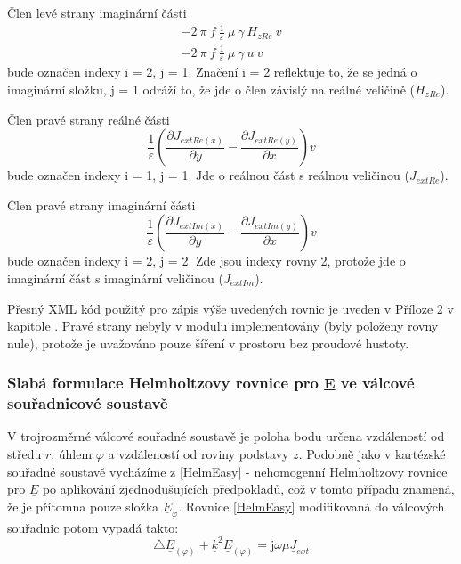 \documentclass[12pt,a4paper,oneside]{article}
\numberwithin{equation}{section} %
\numberwithin{figure}{section} %
\numberwithin{table}{section} %
\newcommand{\mj}{\mathrm{j}} %
\newcommand{\faz}[1]{{\underline{#1}}} %
\begin{document}
Člen levé strany imaginární části
\begin{subequations}
\begin{gather}
- 2 ~ \pi ~ f ~ \frac{1}{\varepsilon} ~ \mu ~ \gamma ~ H _{zRe} ~ v
\\
- 2 ~ \pi ~ f ~ \frac{1}{\varepsilon} ~ \mu ~ \gamma ~ u ~ v
\end{gather}
\end{subequations}
bude označen indexy i = 2, j = 1. Značení i = 2 reflektuje to, že se jedná o imaginární složku, j = 1 odráží to, že jde o člen závislý na reálné veličině ($H _{zRe}$).

Člen pravé strany reálné části
\begin{equation}
\frac{1}{\varepsilon} \left( \frac{\partial J _{extRe(x)}}{\partial y} - \frac{\partial J _{extRe(y)}}{\partial x} \right) v
\end{equation}
bude označen indexy i = 1, j = 1. Jde o reálnou část s reálnou veličinou ($J _{extRe}$). 

Člen pravé strany imaginární části
\begin{equation}
\frac{1}{\varepsilon} \left(\frac{\partial J _{extIm(x)}}{\partial y} - \frac{\partial J _{extIm(y)}}{\partial x} \right)  v
\end{equation}
bude označen indexy i = 2, j = 2. Zde jsou indexy rovny 2, protože jde o imaginární část s imaginární veličinou ($J _{extIm}$).

Přesný XML kód použitý pro zápis výše uvedených rovnic je uveden v Příloze 2 v kapitole . Pravé strany nebyly v modulu implementovány (byly položeny rovny nule), protože je uvažováno pouze šíření v prostoru bez proudové hustoty.


\subsubsection{Slabá formulace Helmholtzovy rovnice pro \faz{E} ve válcové souřadnicové soustavě}

V trojrozměrné válcové souřadné soustavě je poloha bodu určena vzdáleností od středu $r$, úhlem $\varphi$ a vzdáleností od roviny podstavy $z$. Podobně jako v kartézské souřadné soustavě vycházíme z \ref{HelmEasy} - nehomogenní Helmholtzovy rovnice pro $\faz{E}$ po aplikování zjednodušujících předpokladů, což v tomto případu znamená, že je přítomna pouze složka $\faz{E} _{\varphi}$. Rovnice \ref{HelmEasy} modifikovaná do válcových souřadnic potom vypadá takto:
\begin{equation}
\triangle \faz{E} _{(\varphi)} + \faz{k} ^2 \faz{E} _{(\varphi)} = \mj \omega \mu \faz{J} _{ext} 
\end{equation}
\end{document}
